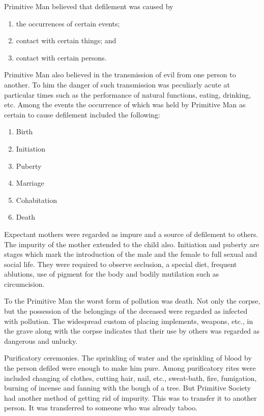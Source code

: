 \documentclass{article}
\begin{document}
\begin{shadequote}
Primitive Man believed that defilement was caused by
\begin{enumerate}
\item the occurrences of certain events;
\item contact with certain things; and
\item contact with certain persons.
\end{enumerate}

Primitive Man also believed in the transmission of evil from one person to another. To him the danger of such transmission was peculiarly acute at particular times such as the performance of natural functions, eating, drinking, etc. Among the events the occurrence of which was held by Primitive Man as certain to cause defilement included the following:
\begin{enumerate}
\item Birth
\item Initiation
\item Puberty
\item Marriage
\item Cohabitation
\item Death
\end{enumerate}

Expectant mothers were regarded as impure and a source of defilement to others. The impurity of the mother extended to the child also. Initiation and puberty are stages which mark the introduction of the male and the female to full sexual and social life. They were required to observe seclusion, a special diet, frequent ablutions, use of pigment for the body and bodily mutilation such as circumcision.

To the Primitive Man the worst form of pollution was death. Not only the corpse, but the possession of the belongings of the deceased were regarded as infected with pollution. The widespread custom of placing implements, weapons, etc., in the grave along with the corpse indicates that their use by others was regarded as dangerous and unlucky.

Purificatory ceremonies. The sprinkling of water and the sprinkling of blood by the person defiled were enough to make him pure. Among purificatory rites were included changing of clothes, cutting hair, nail, etc., sweat-bath, fire, fumigation, burning of incense and fanning with the bough of a tree. But Primitive Society had another method of getting rid of impurity. This was to transfer it to another person. It was transferred to someone who was already taboo.
\end{shadequote}
\end{document}
